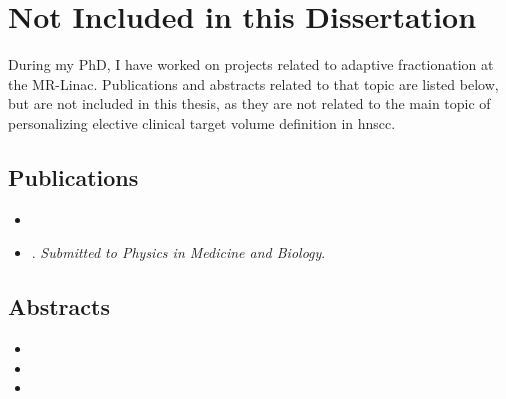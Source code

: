\documentclass[\relativeRoot/main.tex]{subfiles}
\begin{document}
\section*{Not Included in this Dissertation}

During my PhD, I have worked on projects related to adaptive fractionation at the MR-Linac. Publications and abstracts related to that topic are listed below, but are not included in this thesis, as they are not related to the main topic of personalizing elective clinical target volume definition in \gls{hnscc}.

\subsection*{Publications}
\begin{itemize}
    \item {}
    \item {}. \emph{Submitted to Physics in Medicine and Biology}.
\end{itemize}

\subsection*{Abstracts}
\begin{itemize}
    \item {}
    \item {}
    \item {}
\end{itemize}

\tableofcontents
\thispagestyle{plain}
\end{document}
